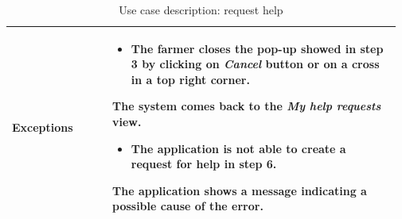 \begin{table}[H]
\begin{tabular}{@{}p{0.25\linewidth} p{0.72\linewidth}@{}}
		\textbf{Exceptions}         & \begin{itemize}[leftmargin=.4cm,noitemsep,topsep=0pt,before=\vspace{-3mm}]
		   \item The farmer closes the pop-up showed in step 3 by clicking on \textit{Cancel} button or on a  cross in a top right corner.
		\end{itemize}
	    The system comes back to the \textit{My help requests} view.
	    \begin{itemize}[leftmargin=.4cm,noitemsep,topsep=0pt]
		   \item The application is not able to create a request for help in step 6. 
		\end{itemize}
		The application shows a message indicating a possible cause of the error.\\
		\bottomrule
	\end{tabular}
	\caption{Use case description: request help} 
\end{table}

